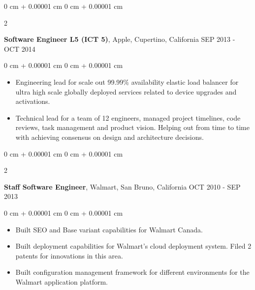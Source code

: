\documentclass[10pt, letterpaper]{article}
\newenvironment{highlights}{
    \begin{itemize}[
        topsep=0.10 cm,
        parsep=0.10 cm,
        partopsep=0pt,
        itemsep=0pt,
        leftmargin=0 cm + 10pt
    ]
}{
    \end{itemize}
} %
\newenvironment{onecolentry}{
    \begin{adjustwidth}{
        0 cm + 0.00001 cm
    }{
        0 cm + 0.00001 cm
    }
}{
    \end{adjustwidth}
} %
\newenvironment{twocolentry}[2][]{
    \onecolentry
    \def\secondColumn{#2}
    \setcolumnwidth{\fill, 4.5 cm}
    \begin{paracol}{2}
}{
    \switchcolumn \raggedleft \secondColumn
    \end{paracol}
    \endonecolentry
} %
\begin{document}
        \vspace{2.60 cm}
        \begin{twocolentry}{
            SEP 2013 - OCT 2014
        }
            \textbf{Software Engineer L5 (ICT 5)}, Apple, Cupertino, California\end{twocolentry}
        \vspace{0.10 cm}
        \begin{onecolentry}
            \begin{highlights}
                \item Engineering lead for scale out 99.99\% availability elastic load balancer for ultra high scale globally deployed services related to device upgrades and activations.
                \item Technical lead for a team of 12 engineers, managed project timelines, code reviews, task management and product vision. Helping out from time to time with achieving consensus on design and architecture decisions.
            \end{highlights}
        \end{onecolentry}

        \vspace{0.20 cm}
        \begin{twocolentry}{
            OCT 2010 - SEP 2013
        }
            \textbf{Staff Software Engineer}, Walmart, San Bruno, California\end{twocolentry}
        \vspace{0.10 cm}
        \begin{onecolentry}
            \begin{highlights}
                \item Built SEO and Base variant capabilities for Walmart Canada.
                \item Built deployment capabilities for Walmart's cloud deployment system. Filed 2 patents for innovations in this area.
                \item Built configuration management framework for different environments for the Walmart application platform.
            \end{highlights}
        \end{onecolentry}
\end{document}
